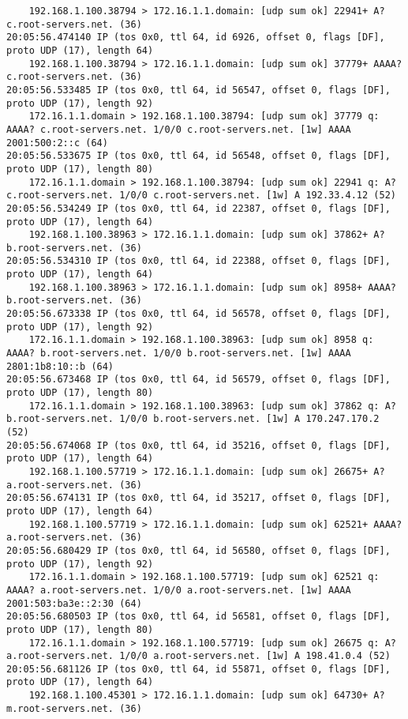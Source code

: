 \documentclass{article}
\begin{document}
{\begin{lstlisting}
    192.168.1.100.38794 > 172.16.1.1.domain: [udp sum ok] 22941+ A? c.root-servers.net. (36)
20:05:56.474140 IP (tos 0x0, ttl 64, id 6926, offset 0, flags [DF], proto UDP (17), length 64)
    192.168.1.100.38794 > 172.16.1.1.domain: [udp sum ok] 37779+ AAAA? c.root-servers.net. (36)
20:05:56.533485 IP (tos 0x0, ttl 64, id 56547, offset 0, flags [DF], proto UDP (17), length 92)
    172.16.1.1.domain > 192.168.1.100.38794: [udp sum ok] 37779 q: AAAA? c.root-servers.net. 1/0/0 c.root-servers.net. [1w] AAAA 2001:500:2::c (64)
20:05:56.533675 IP (tos 0x0, ttl 64, id 56548, offset 0, flags [DF], proto UDP (17), length 80)
    172.16.1.1.domain > 192.168.1.100.38794: [udp sum ok] 22941 q: A? c.root-servers.net. 1/0/0 c.root-servers.net. [1w] A 192.33.4.12 (52)
20:05:56.534249 IP (tos 0x0, ttl 64, id 22387, offset 0, flags [DF], proto UDP (17), length 64)
    192.168.1.100.38963 > 172.16.1.1.domain: [udp sum ok] 37862+ A? b.root-servers.net. (36)
20:05:56.534310 IP (tos 0x0, ttl 64, id 22388, offset 0, flags [DF], proto UDP (17), length 64)
    192.168.1.100.38963 > 172.16.1.1.domain: [udp sum ok] 8958+ AAAA? b.root-servers.net. (36)
20:05:56.673338 IP (tos 0x0, ttl 64, id 56578, offset 0, flags [DF], proto UDP (17), length 92)
    172.16.1.1.domain > 192.168.1.100.38963: [udp sum ok] 8958 q: AAAA? b.root-servers.net. 1/0/0 b.root-servers.net. [1w] AAAA 2801:1b8:10::b (64)
20:05:56.673468 IP (tos 0x0, ttl 64, id 56579, offset 0, flags [DF], proto UDP (17), length 80)
    172.16.1.1.domain > 192.168.1.100.38963: [udp sum ok] 37862 q: A? b.root-servers.net. 1/0/0 b.root-servers.net. [1w] A 170.247.170.2 (52)
20:05:56.674068 IP (tos 0x0, ttl 64, id 35216, offset 0, flags [DF], proto UDP (17), length 64)
    192.168.1.100.57719 > 172.16.1.1.domain: [udp sum ok] 26675+ A? a.root-servers.net. (36)
20:05:56.674131 IP (tos 0x0, ttl 64, id 35217, offset 0, flags [DF], proto UDP (17), length 64)
    192.168.1.100.57719 > 172.16.1.1.domain: [udp sum ok] 62521+ AAAA? a.root-servers.net. (36)
20:05:56.680429 IP (tos 0x0, ttl 64, id 56580, offset 0, flags [DF], proto UDP (17), length 92)
    172.16.1.1.domain > 192.168.1.100.57719: [udp sum ok] 62521 q: AAAA? a.root-servers.net. 1/0/0 a.root-servers.net. [1w] AAAA 2001:503:ba3e::2:30 (64)
20:05:56.680503 IP (tos 0x0, ttl 64, id 56581, offset 0, flags [DF], proto UDP (17), length 80)
    172.16.1.1.domain > 192.168.1.100.57719: [udp sum ok] 26675 q: A? a.root-servers.net. 1/0/0 a.root-servers.net. [1w] A 198.41.0.4 (52)
20:05:56.681126 IP (tos 0x0, ttl 64, id 55871, offset 0, flags [DF], proto UDP (17), length 64)
    192.168.1.100.45301 > 172.16.1.1.domain: [udp sum ok] 64730+ A? m.root-servers.net. (36)

\end{lstlisting}}
\end{document}
